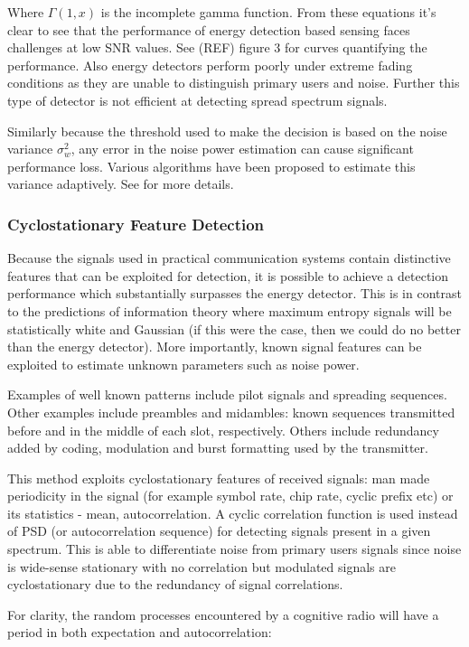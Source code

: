 Where \( \Gamma\left(1,x\right)\) is the incomplete gamma function. From these equations it's clear to see that the performance of energy detection based sensing faces challenges at low SNR values. See (REF) figure 3 for curves quantifying the performance. Also energy detectors perform poorly under extreme fading conditions as they are unable to distinguish primary users and noise. Further this type of detector is not efficient at detecting spread spectrum signals. 

Similarly because the threshold used to make the decision is based on the noise variance \(\sigma_w^2\), any error in the noise power estimation can cause significant performance loss. Various algorithms have been proposed to estimate this variance adaptively. See \cite{Yucek2009} for more details.

\subsubsection{Cyclostationary Feature Detection}
Because the signals used in practical communication systems contain distinctive features that can be exploited for detection, it is possible to achieve a detection performance which substantially surpasses the energy detector. This is in contrast to the predictions of information theory where maximum entropy signals will be statistically white and Gaussian (if this were the case, then we could do no better than the energy detector). More importantly, known signal features can be exploited to estimate unknown parameters such as noise power. 

Examples of well known patterns include pilot signals and spreading sequences. Other examples include preambles and midambles: known sequences transmitted before and in the middle of each slot, respectively. Others include redundancy added by coding, modulation and burst formatting used by the transmitter. 

This method exploits cyclostationary features of received signals: man made periodicity in the signal (for example symbol rate, chip rate, cyclic prefix etc) or its statistics - mean, autocorrelation. A cyclic correlation function is used instead of PSD (or autocorrelation sequence) for detecting signals present in a given spectrum. This is able to differentiate noise from primary users signals since noise is wide-sense stationary with no correlation but modulated signals are cyclostationary due to the redundancy of signal correlations. 

For clarity, the random processes encountered by a cognitive radio will have a period in both expectation and autocorrelation:

